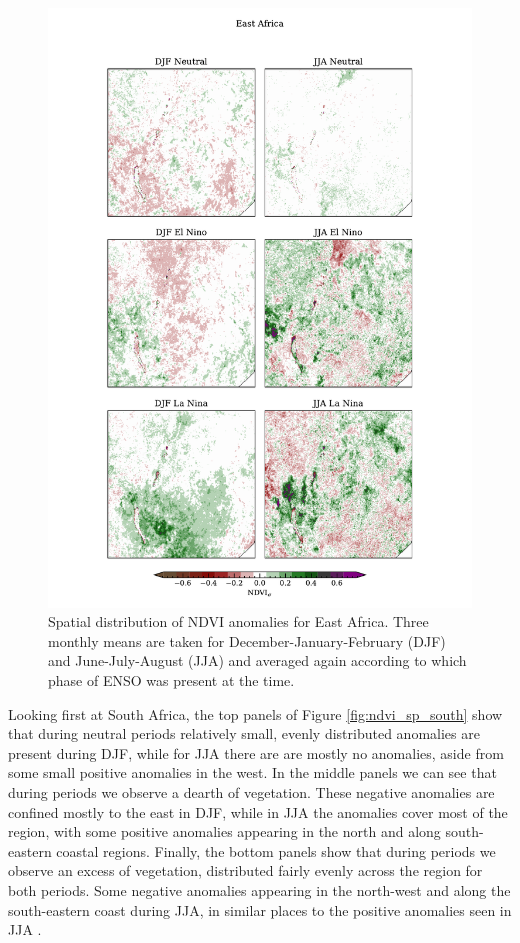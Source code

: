 \begin{figure}
  \centering
  \includegraphics[height=0.9\textheight]{figures/ndvi_spatial_seasonal_anomalies_eastafrica}
  \caption{Spatial distribution of NDVI anomalies for East
    Africa. Three monthly means are taken for
    December-January-February (DJF) and June-July-August (JJA) and
    averaged again according to which phase of ENSO was present at the
    time.}
  \label{fig:ndvi_sp_east}
\end{figure}

Looking first at South Africa, the top panels of Figure
\ref{fig:ndvi_sp_south} show that during neutral periods relatively
small, evenly distributed anomalies are present during DJF, while for
JJA there are are mostly no anomalies, aside from some small positive
anomalies in the west. In the middle panels we can see that during
\elnino{} periods we observe a dearth of vegetation. These negative
anomalies are confined mostly to the east in DJF, while in JJA the
anomalies cover most of the region, with some positive anomalies
appearing in the north and along south-eastern coastal
regions. Finally, the bottom panels show that during \nina{} periods
we observe an excess of vegetation, distributed fairly evenly across
the region for both periods. Some negative anomalies appearing in
the north-west and along the south-eastern coast during JJA, in similar places to the positive anomalies seen in JJA \elnino{}.


